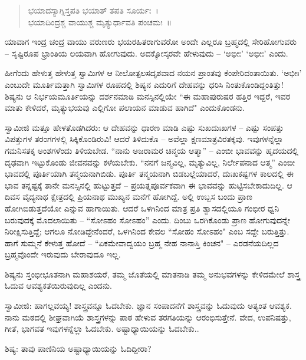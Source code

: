 \begin{verse}
ಭಯಾದಸ್ಯಾಗ್ನಿಸ್ತಪತಿ ಭಯಾತ್ ತಪತಿ ಸೂರ್ಯಃ~।\\ಭಯಾದಿಂದ್ರಶ್ಚ ವಾಯುಶ್ಚ ಮೃತ್ಯುರ್ಧಾವತಿ ಪಂಚಮಃ~॥
\end{verse}

ಯಾವಾಗ ಇಂದ್ರ ಚಂದ್ರ ವಾಯು ವರುಣರು ಭಯರಹಿತರಾಗುವರೋ ಅಂದೇ ಎಲ್ಲರೂ ಬ್ರಹ್ಮದಲ್ಲಿ ಸೇರಿಹೋಗುವರು – ಸೃಷ್ಟಿರೂಪ ಭ್ರಾಂತಿಯ ಲಯವಾಗಿ ಹೋಗುವುದು. ಅದಕ್ಕೋಸ್ಕರವೇ ಹೇಳುವುದು – ‘ಅಭೀಃ’ ‘ಅಭೀಃ’ ಎಂದು.

ಹೀಗೆಂದು ಹೇಳುತ್ತ ಹೇಳುತ್ತ ಸ್ವಾಮಿಗಳ ಆ ನೀಲೋತ್ಪಲಸದೃಶವಾದ ನಯನ ಪ್ರಾಂತವು ಕೆಂಪೇರಿದಂತಾಯಿತು. ‘ಅಭೀಃ’ ಎಂಬುದೇ ಮೂರ್ತಿಮತ್ತಾಗಿ ಸ್ವಾಮಿಗಳ ರೂಪದಲ್ಲಿ ಶಿಷ್ಯನ ಎದುರಿಗೆ ದೇಹವನ್ನು ಧರಿಸಿ ನಿಂತುಕೊಂಡಿದ್ದಂತಿತ್ತು! ಶಿಷ್ಯನು ಆ ನಿರ್ಭಯಮೂರ್ತಿಯನ್ನು ದರ್ಶನಮಾಡಿ ಮನಸ್ಸಿನಲ್ಲಿಯೇ “ಈ ಮಹಾಪುರುಷರ ಹತ್ತಿರ ಇದ್ದರೆ, ಇವರ ಮಾತು ಕೇಳಿದರೆ, ಮೃತ್ಯುಭಯವು ಎಲ್ಲಿಗೋ ಪಲಾಯನ ಮಾಡುವ ಹಾಗಿದೆ" ಎಂದುಕೊಂಡನು.

ಸ್ವಾಮೀಜಿ ಮತ್ತೂ ಹೇಳತೊಡಗಿದರು: ಆ ದೇಹವನ್ನು ಧಾರಣ ಮಾಡಿ ಎಷ್ಟು ಸುಖದುಃಖಗಳ – ಎಷ್ಟು ಸಂಪತ್ತು ವಿಪತ್ತುಗಳ ತರಂಗಗಳಲ್ಲಿ ಸಿಕ್ಕಿಕೊಂಡಿರುವಿ! ಆದರೆ ತಿಳಿದುಕೊ – ಅವೆಲ್ಲಾ ಕ್ಷಣಮಾತ್ರವಿರತಕ್ಕವು. ಇವುಗಳನ್ನೆಲ್ಲಾ ಗಮನಿಸತಕ್ಕ ಅಂಶಗಳೆಂದು ತಿಳಿಯಬೇಡ. “ನಾನು ಅಜರಾಮರ ಚಿನ್ಮಯ ಆತ್ಮಾ” – ಎಂಬೀ ಭಾವವನ್ನು ಹೃದಯದಲ್ಲಿ ದೃಢವಾಗಿ ಇಟ್ಟುಕೊಂಡು ಜೀವನವನ್ನು ಕಳೆಯಬೇಕು. “ನನಗೆ ಜನ್ಮವಿಲ್ಲ, ಮೃತ್ಯುವಿಲ್ಲ, ನಿರ್ಲೇಪನಾದ ಆತ್ಮ” ಎಂಬೀ ಭಾವದಲ್ಲಿ ಪೂರ್ತಿಯಾಗಿ ತನ್ಮಯನಾಗಿಬಿಡು. ಪೂರ್ತಿ ತನ್ಮಯನಾಗಿ ಬಿಡಬಲ್ಲೆಯಾದರೆ, ದುಃಖಕಷ್ಟಗಳ ಕಾಲದಲ್ಲಿ ಈ ಭಾವ ತನ್ನಷ್ಟಕ್ಕೆ ತಾನೇ ಮನಸ್ಸಿನಲ್ಲಿ ಹುಟ್ಟುತ್ತದೆ – ಪ್ರಯತ್ನಪೂರ್ವಕವಾಗಿ ಈ ಭಾವವನ್ನು ಹುಟ್ಟಿಸಬೇಕಾದುದಿಲ್ಲ. ಆ ದಿವಸ ವೈದ್ಯನಾಥ ಕ್ಷೇತ್ರದಲ್ಲಿ ಪ್ರಿಯನಾಥ ಮುಖ್ಯನ ಮನೆಗೆ ಹೋಗಿದ್ದೆ. ಅಲ್ಲಿ ಉಬ್ಬಸ ಬಂದು ಪ್ರಾಣ ಹೋಗಿಬಿಡುತ್ತದೆಯೋ ಎನ್ನುವ ಹಾಗಾಯಿತು. ಆದರೆ ಒಳಗಿನಿಂದ ಮಾತ್ರ ಪ್ರತಿ ಶ್ವಾಸದಲ್ಲಿಯೂ ಗಂಭೀರ ಧ್ವನಿ ಬರುವುದಕ್ಕೆ ಮೊದಲಾಯಿತು – “ಸೋಽಹಂ ಸೋಽಹಂ” ಎಂದು. ದಿಂಬು ಒರಗಿಕೊಂಡು ಪ್ರಾಣ ಹೋಗುವುದನ್ನೇ ನಿರೀಕ್ಷಿಸುತ್ತಿದ್ದೆ; ಆಗಲೂ ನೋಡಿದ್ದೇನೆಂದರೆ, ಒಳಗಿನಿಂದ ಕೇವಲ “ಸೋಹಂ ಸೋಽಹಂ" ಎಂಬ ಸದ್ದೇ ಬರುತ್ತಿತ್ತು. ಹಾಗೆ ಸುಮ್ಮನೆ ಕೇಳುತ್ತ ಹೋದೆ – “ಏಕಮೇವಾದ್ವಯಂ ಬ್ರಹ್ಮ ನೇಹ ನಾನಾಸ್ತಿ ಕಿಂಚನ" – ಎರಡನೆಯದಿಲ್ಲದ ಬ್ರಹ್ಮವೊಂದೇ ಇರುವುದು ಬೇರಾವುದೂ ಇಲ್ಲ.

ಶಿಷ್ಯನು ಸ್ತಂಭೀಭೂತನಾಗಿ ಮಹಾಶಯರೆ, ತಮ್ಮ ಜೊತೆಯಲ್ಲಿ ಮಾತನಾಡಿ ತಮ್ಮ ಅನುಭವಗಳನ್ನು ಕೇಳಿದಮೇಲೆ ಶಾಸ್ತ್ರ ಓದುವ ಆವಶ್ಯಕತೆಯಿರುವುದಿಲ್ಲ ಎಂದನು.

ಸ್ವಾಮೀಜಿ: ಹಾಗಲ್ಲವಯ್ಯ! ಶಾಸ್ತ್ರವನ್ನೂ ಓದಬೇಕು. ಜ್ಞಾನ ಸಂಪಾದನೆಗೆ ಶಾಸ್ತ್ರವನ್ನು ಓದುವುದು ಅತ್ಯಂತ ಆವಶ್ಯಕ. ನಾನು ಮಠದಲ್ಲಿ ಶೀಘ್ರವಾಗಿಯೆ ಶಾಸ್ತ್ರಗಳನ್ನು ಪಾಠ ಹೇಳುವ ತರಗತಿಯನ್ನು ಆರಂಭಿಸುತ್ತೇನೆ. ವೇದ, ಉಪನಿಷತ್ತು, ಗೀತೆ, ಭಾಗವತ ಇವುಗಳನ್ನೆಲ್ಲಾ ಓದಬೇಕು. ಅಷ್ಟಾಧ್ಯಾಯಿಯನ್ನು ಓದಬೇಕು..

ಶಿಷ್ಯ: ತಾವು ಪಾಣಿನಿಯ ಅಷ್ಟಾಧ್ಯಾಯಿಯನ್ನು ಓದಿದ್ದೀರಾ?

